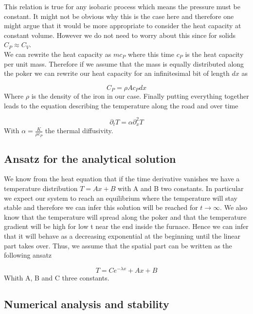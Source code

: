 \documentclass[10 pt]{article}
\numberwithin{equation}{section}
\begin{document}
\begin{multicols}{2}
This relation is true for any isobaric process which means the pressure must be constant. It might not be obvious why this is the case here and therefore one might argue that it would be more appropriate to consider the heat capacity at constant volume. However we do not need to worry about this since for solids $C_P \approx C_V$.\\
We can rewrite the heat capacity as $m c_P$ where this time $c_P$ is the heat capacity per unit mass. Therefore if we assume that the mass is equally distributed along the poker we can rewrite our heat capacity for an infinitesimal bit of length $dx$ as

\begin{equation}
C_P = \rho A  c_P dx
\end{equation}
Where $\rho$ is the density of the iron in our case. Finally putting everything together leads to the equation describing the temperature along the road and over time

\begin{equation}
\partial_t T= \alpha \partial_x^2 T
\end{equation}
With $\alpha = \frac{K}{\rho c_P}$ the thermal diffusivity.

\subsection{Ansatz for the analytical solution}
We know from the heat equation that if the time derivative vanishes we have a temperature distribution $T = Ax + B$ with A and B two constants. In particular we expect our system to reach an equilibrium where the temperature will stay stable and therefore we can infer this solution will be reached for $t \rightarrow \infty$. We also know that the temperature will spread along the poker and that the temperature gradient will be high for low t near the end inside the furnace. Hence we can infer that it will behave as a decreasing exponential at the beginning until the linear part takes over. Thus, we assume that the spatial part can be written as the following ansatz

\begin{equation}
T = C e^{-\lambda x} + Ax + B
\end{equation}
Whith A, B and C three constants.

\subsection{Numerical analysis and stability}


\end{multicols}
\end{document}

